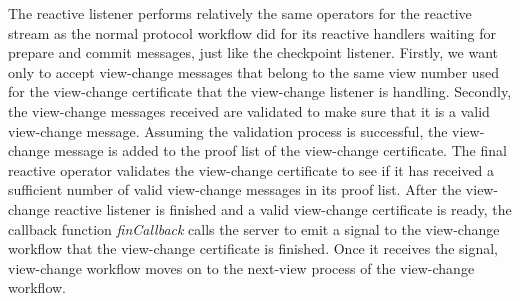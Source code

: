 The reactive listener performs relatively the same operators for the reactive stream as the normal protocol workflow did for its reactive handlers waiting for prepare and commit messages, just like the checkpoint listener. Firstly, we want only to accept view-change messages that belong to the same view number used for the view-change certificate that the view-change listener is handling. Secondly, the view-change messages received are validated to make sure that it is a valid view-change message. Assuming the validation process is successful, the view-change message is added to the proof list of the view-change certificate. The final reactive operator validates the view-change certificate to see if it has received a sufficient number of valid view-change messages in its proof list. After the view-change reactive listener is finished and a valid view-change certificate is ready, the callback function \emph{finCallback} calls the server to emit a signal to the view-change workflow that the view-change certificate is finished. Once it receives the signal, view-change workflow moves on to the next-view process of the view-change workflow. 

